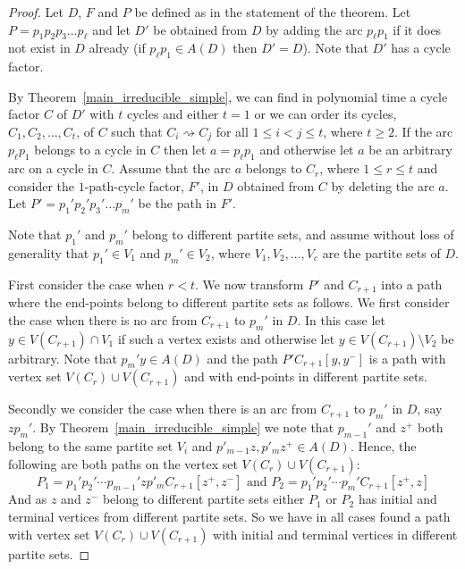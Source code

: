 \documentclass{article}
\newcommand{\GGnn}[1]{{#1}}
\newcommand{\wdom}[1]{\rightsquigarrow}
\newcommand{\2}{\vspace{0.2cm}}
\begin{document}
\begin{proof}

Let $D$, ${F}$ and $P$ be defined as in the statement of the theorem. Let $P=p_1 p_2 p_3 \ldots p_{\ell}$ and
let $D'$ be obtained from $D$ by adding the arc $p_{\ell} p_1$ if it does not exist in $D$ already (if $p_{\ell} p_1 \in A(D)$ then $D'=D$).
Note that $D'$ has a cycle factor. 

By Theorem~\ref{main_irreducible_simple}, we can find in polynomial time a cycle factor $C$  of $D'$ with $t$ cycles and either $t=1$ or we can order its cycles, $C_1,C_2,\ldots,C_t$, of ${C}$ such that
$C_i \wdom{} C_j$ for all $1 \leq i < j \leq t$, where $t \geq 2$. If the arc $p_{\ell} p_1$ belongs to a cycle in ${C}$ then let $a=p_{\ell} p_1$ and otherwise let $a$ be an arbitrary arc on a cycle in ${C}$.
Assume that the arc $a$ belongs to $C_r$, where $1 \leq r \leq t$ and consider the $1$-path-cycle factor, ${F}'$, in $D$ obtained from
${C}$ by deleting the arc $a$. Let $P'=p_1' p_2' p_3' \ldots p_m'$ be the path in ${F}'$.

Note that $p_1'$ and $p_m'$ belong to different partite sets, and assume without loss of generality that $p_1' \in V_1$ and $p_m' \in V_2$, where
$V_1,V_2,\ldots,V_c$ are the partite sets of $D$.

First consider the case when $r<t$. We now transform $P'$ and $C_{r+1}$ into a path where the end-points belong to different partite sets as follows.
We first consider the case when there is no arc from $C_{r+1}$ to $p_m'$ in $D$. In this case let $y \in V(C_{r+1}) \cap V_1$ if such a vertex exists and otherwise let $y \in V(C_{r+1}) \setminus V_2$ be arbitrary. Note that $p_m' y \in A(D)$ and the path $P' C_{r+1}[y,y^-]$ is a path with vertex set $V(C_r) \cup V(C_{r+1})$ and with end-points in different partite sets.

Secondly we consider the case when there is an arc from $C_{r+1}$ to $p_m'$ in $D$, say $z p_m'$.
By Theorem~\ref{main_irreducible_simple} we note that $p_{m-1}'$ and $z^+$ both belong to the same partite set $V_i$ \GGnn{and $p'_{m-1}z,p'_mz^+\in A(D).$} 
Hence, the following are both paths on the vertex set $V(C_r) \cup V(C_{r+1})$:
\[
P_1 = p_1' p_2' \cdots p_{m-1}' z p'_m C_{r+1}[z^+,z^-] \mbox{ and }
P_2 = p_1' p_2' \cdots p_{m}' C_{r+1}[z^+,z]
\]
And as $z$ and $z^-$ belong to different partite sets either $P_1$ or $P_2$ has initial and terminal vertices from different partite sets. So we have in all cases
found a path with vertex set $V(C_r) \cup V(C_{r+1})$ with  initial and terminal vertices in different partite sets.


\end{proof}
\end{document}
